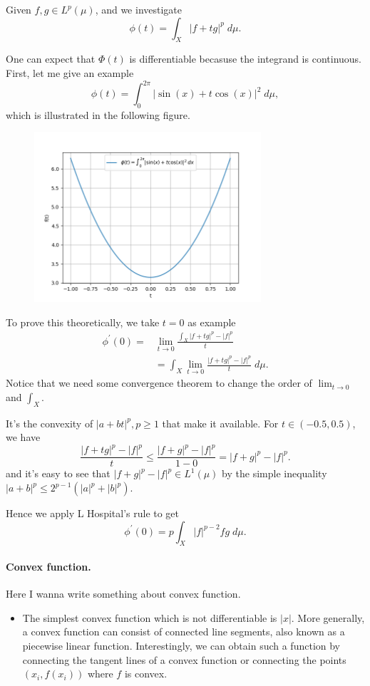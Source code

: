 \documentclass{article}
\begin{document}
Given $f, g\in L^{p}(\mu)$, and we investigate
$$
\phi(t)=\int_X|f+t g|^p \;d \mu.
$$

One can expect that $\Phi(t)$ is differentiable becasuse the integrand is continuous. First, let me give an example
$$
\phi(t)=\int_{0}^{2\pi}|\sin(x)+t \cos(x)|^2 \;d \mu,
$$
which is illustrated in the following figure.

\begin{figure}[ht]
    \centering
    \includegraphics[width=0.75\textwidth]{Figure_1.png}
    \caption{}
    \label{fig:my_label}
\end{figure}

To prove this theoretically, we take $t=0$ as example
$$
\begin{aligned}
\phi^{\prime}(0)=& \lim _{t \rightarrow 0} \frac{\int_{X}|f+tg|^{p}-|f|^{p}}{t} \\
&= \int_{X} \lim _{t \rightarrow 0} \frac{|f+tg|^{p}-|f|^{p}}{t} \;d \mu.
\end{aligned}
$$
Notice that we need some convergence theorem to change the order of $\lim_{t\to 0}$ and $\int_{X}$.

It's the convexity of $|a+bt|^{p},p\geq 1$ that make it available.
For $t\in(-0.5,0.5)$, we have 
$$
\frac{|f+tg|^{p}-|f|^{p}}{t} \leq \frac{|f+g|^{p}-|f|^{p}}{1-0} = |f+g|^{p}-|f|^{p}.
$$
and it's easy to see that $|f+g|^{p}-|f|^{p}\in L^{1}(\mu)$ by the simple inequality $|a+b|^{p}\leq 2^{p-1}(|a|^{p}+|b|^{p})$.

Hence we apply L Hospital's rule to get
$$
\phi^{\prime}(0)=p \int_X|f|^{p-2} f g \;d \mu .
$$


\paragraph{Convex function.}
Here I wanna write something about convex function. 
 \begin{itemize}
\item The simplest convex function which is not differentiable is $|x|$.  More generally, a convex function can consist of connected line segments, also known as a piecewise linear function.
Interestingly, we can obtain such a function by connecting the tangent lines of a convex function or
connecting the points $(x_{i},f(x_{i}))$ where $f$ is convex.
\end{itemize}
\end{document}
